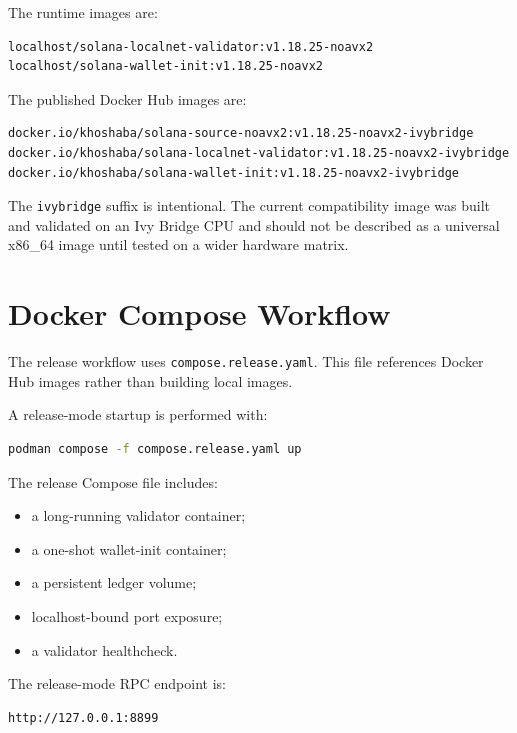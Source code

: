 \documentclass[11pt,a4paper]{article}
\begin{document}
The runtime images are:

\begin{lstlisting}
localhost/solana-localnet-validator:v1.18.25-noavx2
localhost/solana-wallet-init:v1.18.25-noavx2
\end{lstlisting}

The published Docker Hub images are:

\begin{lstlisting}
docker.io/khoshaba/solana-source-noavx2:v1.18.25-noavx2-ivybridge
docker.io/khoshaba/solana-localnet-validator:v1.18.25-noavx2-ivybridge
docker.io/khoshaba/solana-wallet-init:v1.18.25-noavx2-ivybridge
\end{lstlisting}

The \texttt{ivybridge} suffix is intentional. The current compatibility image was built and validated on an Ivy Bridge CPU and should not be described as a universal x86\_64 image until tested on a wider hardware matrix.

\section{Docker Compose Workflow}

The release workflow uses \texttt{compose.release.yaml}. This file references Docker Hub images rather than building local images.

A release-mode startup is performed with:

\begin{lstlisting}[language=bash]
podman compose -f compose.release.yaml up
\end{lstlisting}

The release Compose file includes:

\begin{itemize}[leftmargin=2em]
  \item a long-running validator container;
  \item a one-shot wallet-init container;
  \item a persistent ledger volume;
  \item localhost-bound port exposure;
  \item a validator healthcheck.
\end{itemize}

The release-mode RPC endpoint is:

\begin{lstlisting}
http://127.0.0.1:8899
\end{lstlisting}
\end{document}
